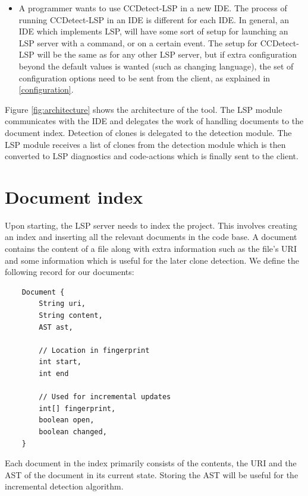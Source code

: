 \begin{itemize}
      \item A programmer wants to use CCDetect-LSP in a new IDE. The process of running
          CCDetect-LSP in an IDE is different for each IDE. In general, an IDE which
          implements LSP, will have some sort of setup for launching an LSP server with a
          command, or on a certain event. The setup for CCDetect-LSP will be the same as
          for any other LSP server, but if extra configuration beyond the default values
          is wanted (such as changing language), the set of configuration options need to
          be sent from the client, as explained in \cref{configuration}.

\end{itemize}


Figure \ref{fig:architecture} shows the architecture of the tool. The LSP module
communicates with the IDE and delegates the work of handling documents to the document
index. Detection of clones is delegated to the detection module. The LSP module receives a
list of clones from the detection module which is then converted to LSP diagnostics and
code-actions which is finally sent to the client.

\section{Document index}

Upon starting, the LSP server needs to index the project. This involves creating an index
and inserting all the relevant documents in the code base. A document contains the content
of a file along with extra information such as the file's URI and some information which
is useful for the later clone detection. We define the following record for our documents:

\begin{lstlisting}
    Document {
        String uri,
        String content,
        AST ast,

        // Location in fingerprint
        int start,
        int end

        // Used for incremental updates
        int[] fingerprint,
        boolean open,
        boolean changed,
    }
\end{lstlisting}

Each document in the index primarily consists of the contents, the URI and the AST of the
document in its current state. Storing the AST will be useful for the incremental
detection algorithm.

